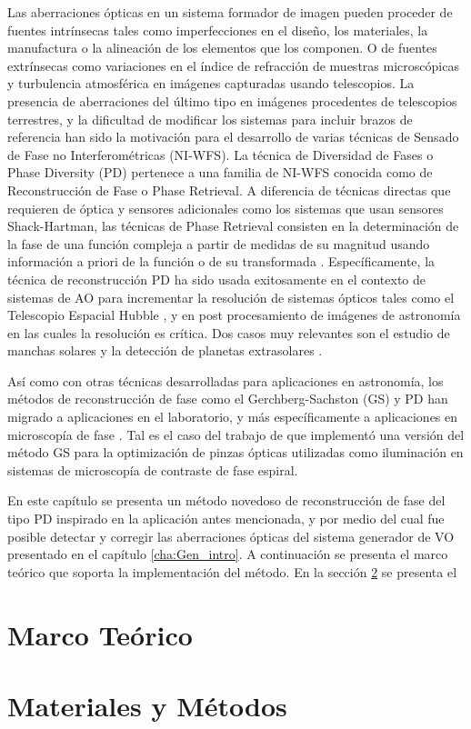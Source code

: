 Las aberraciones ópticas en un sistema formador de imagen pueden
proceder de fuentes intrínsecas tales como imperfecciones en el
diseño, los materiales, la manufactura o la alineación de los
elementos que los componen. O de fuentes extrínsecas como variaciones
en el índice de refracción de muestras microscópicas y turbulencia atmosférica en
imágenes capturadas usando telescopios. La presencia de aberraciones
del último tipo en imágenes procedentes de telescopios terrestres, y
la dificultad de modificar los sistemas para incluir brazos de referencia han sido la motivación para
el desarrollo de varias técnicas de Sensado de Fase no
Interferométricas (NI-WFS). La técnica de Diversidad de Fases o Phase
Diversity (PD) pertenece a una familia de NI-WFS conocida como de
Reconstrucción de Fase o Phase Retrieval. A diferencia de técnicas
directas que requieren de óptica y sensores adicionales como los
sistemas que usan sensores Shack-Hartman, las técnicas de Phase
Retrieval consisten en la determinación de la fase de una función
compleja a partir de medidas de su magnitud usando 
información a priori de la función o de su transformada . 
Específicamente, la técnica de reconstrucción  PD ha sido usada
exitosamente en el contexto de sistemas de AO para incrementar la resolución de sistemas ópticos
tales como el Telescopio Espacial Hubble , y en
post procesamiento de imágenes de astronomía en las cuales la
resolución es crítica. Dos casos muy relevantes son el estudio de
manchas solares y la detección de planetas extrasolares . 

Así como con otras técnicas desarrolladas para aplicaciones en
astronomía, los métodos de reconstrucción de fase como el
Gerchberg-Sachston (GS) y PD han migrado a aplicaciones en el
laboratorio, y más específicamente a aplicaciones en microscopía de
fase . Tal es el caso
del trabajo de  que implementó una versión del
método GS para la optimización de pinzas ópticas utilizadas como
iluminación en sistemas de microscopía de contraste de fase espiral. 

En este capítulo se presenta un método novedoso de reconstrucción de
fase del tipo PD inspirado en la aplicación antes mencionada, y por
medio del cual fue posible detectar y corregir las aberraciones ópticas
del sistema generador de VO presentado en el capítulo
\ref{cha:Gen_intro}.  A continuación se presenta el marco teórico que
soporta la implementación del método. En la sección
\ref{sec:ChPD_materiales_y_metodos} se presenta el 

\section{Marco Teórico}
\label{sec:ChPD_marco_teorico}

\section{Materiales y Métodos}
\label{sec:ChPD_materiales_y_metodos}

\newpage
\pagebreak[4]
